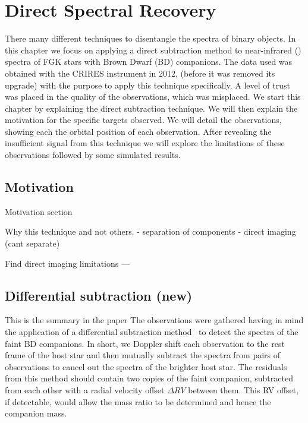 

\chapter{Direct Spectral Recovery}  %
\label{cha:direct_recovery}
There many different techniques to disentangle the spectra of binary objects. In this chapter we focus on applying a direct subtraction method to near-infrared (\nir{}) spectra of FGK stars with Brown Dwarf (BD) companions. The data used was obtained with the {CRIRES} instrument in 2012, (before it was removed its upgrade) with the purpose to apply this technique specifically. A level of trust was placed in the quality of the observations, which was misplaced.
We start this chapter by explaining the direct subtraction technique. We will then explain the motivation for the specific targets observed. We will detail the observations, showing each the orbital position of each observation. After revealing the insufficient signal from this technique we will explore the limitations of these observations followed by some simulated results.

\section{Motivation}


Motivation section

Why this technique and not others.
- separation of components
- direct imaging (cant separate)


Find direct imaging limitations ---



\section{Differential subtraction (new)}
\label{sec:spec_diff}
{\red{} This is the summary in the paper}
The observations were gathered having in mind the application of a differential subtraction method~\citep[e.g.,][]{ferluga_separating_1997, kostogryz_spectral_2013} to detect the spectra of the faint BD companions. In short, we Doppler shift each observation to the rest frame of the host star and then mutually subtract the spectra from pairs of observations to cancel out the spectra of the brighter host star. The residuals from this method should contain two copies of the faint companion, subtracted from each other with a radial velocity offset \(\Delta {RV}\) between them. This {RV} offset, if detectable, would allow the mass ratio to be determined and hence the companion mass.

